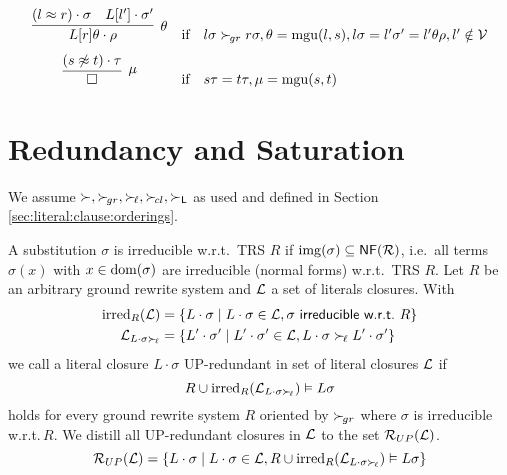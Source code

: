 
\begin{definition}
\begin{gather*}
    \begin{array}{ccl}
        \infer[\theta]
        {L[r]\theta\cdot\rho}
        {(l\mEQ r)\cdot\sigma & L[l']\cdot\sigma'}
        &\text{if}&
        l\sigma\succG r\sigma,
        \theta=\mgu(l,s),
        l\sigma = l'\sigma' = l'\theta\rho,
        l'\notin\mcV
        \\[0.7em]
        \infer[\mu]
        {\emptyclause}
        {(s\mNE t)\cdot\tau}
        &\text{if}&
        s\tau = t\tau,
        \mu=\mgu(s,t)
    \end{array}
\end{gather*}
\end{definition}

\section{Redundancy and Saturation}
    We assume $\succ, \mathrel\succ_{\!gr}, \mathrel\succ_{\!\ell}, \mathrel\succ_{\!cl}, \succ_{\mathsf{L}}$
    as used and defined in
    Section \vref{sec:literal:clause:orderings}.

\begin{definition}
    A substitution \( \sigma \) is irreducible w.r.t.~TRS \( R \)
    if
    \( \operatorname{img}(\sigma)\subseteq\mathsf{NF}(\mathcal{R}) \),
    i.e.~all terms \(\sigma(x)\) with
    \( x\in\operatorname{dom}(\sigma) \) are irreducible (normal forms) w.r.t.~TRS \(R\).
    Let $R$ be an arbitrary ground rewrite system
    and $\mathcal{L}$ a set of literals closures.
    With
    \begin{align*}
        \operatorname{irred}_R(\mathcal{L}) &= \{ L\cdot\sigma \mid L\cdot\sigma\in\mathcal{L},
        \sigma\textsf{ irreducible w.r.t.~}R \}
    \\
        \mathcal{L}_{L\cdot\sigma\mathrel\succ_{\!\ell}} &= \{
            L'\cdot\sigma'\mid L'\cdot\sigma'\in\mathcal{L}, L\cdot\sigma\mathrel\succ_{\!\ell} L'\cdot\sigma'
            \}
    \end{align*}
    we call a literal closure $L\cdot\sigma$ {\myem UP-redundant}
    in set of literal closures $\mathcal{L}$
    if
    \[
        R \cup \operatorname{irred}_R(\mathcal{L}_{L\cdot\sigma\mathrel\succ_{\!\ell}}) \vDash L\sigma
    \]
    holds for every ground rewrite system $R$ oriented by $\mathrel\succ_{\!gr}$
    where $\sigma$ is irreducible w.r.t.\,$R$.
    We distill all UP-redundant closures in \( \mathcal{L} \) to the set
    \( \mathcal{R}_{UP}(\mathcal{L}) \).
    \[
        \mathcal{R}_{UP}(\mathcal{L}) = \{
            L\cdot\sigma
            \mid
            L\cdot\sigma \in \mathcal{L},
            R \cup \operatorname{irred}_R(\mathcal{L}_{L\cdot\sigma\mathrel\succ_{\!\ell}}) \vDash L\sigma
        \}
    \]

\end{definition}

